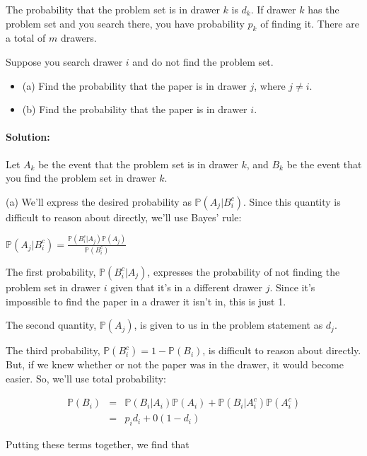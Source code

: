 \documentclass[6008notes.tex]{subfiles}
\begin{document}
The probability that the problem set is in drawer $k$ is $d_k$. If drawer $k$ has the problem set and you search there, you have probability $p_k$ of finding it. There are a total of $m$ drawers.

Suppose you search drawer $i$ and do not find the problem set.

\begin{itemize}
\item (a) Find the probability that the paper is in drawer $j$, where $j \neq i$.

\item (b) Find the probability that the paper is in drawer $i$.
\end{itemize}

\paragraph{Solution:} Let $A_k$ be the event that the problem set is in drawer $k$, and $B_k$ be the event that you find the problem set in drawer $k$.

(a) We'll express the desired probability as $\mathbb {P}(A_ j|B_ i^ c)$. Since this quantity is difficult to reason about directly, we'll use Bayes' rule:

{\centering$\mathbb {P}(A_ j|B_ i^ c) = \frac{\mathbb {P}(B_ i^ c | A_ j) \mathbb {P}(A_ j)}{\mathbb {P}(B_ i^ c)}$ \par}
 
The first probability, $\mathbb {P}(B_ i^ c | A_ j)$, expresses the probability of not finding the problem set in drawer $i$ given that it's in a different drawer $j$. Since it's impossible to find the paper in a drawer it isn't in, this is just 1.

The second quantity, $\mathbb {P}(A_ j)$, is given to us in the problem statement as $d_j$.

The third probability, $\mathbb {P}(B_ i^ c) = 1-\mathbb {P}(B_ i)$, is difficult to reason about directly. But, if we knew whether or not the paper was in the drawer, it would become easier. So, we'll use total probability:

\begin{eqnarray*}
            \mathbb{P}(B_i) &=& \mathbb{P}(B_i|A_i)\mathbb{P}(A_i) + \mathbb{P}(B_i|A_i^c)\mathbb{P}(A_i^c) \\
            &=& p_i d_i + 0 (1-d_i)
\end{eqnarray*}

Putting these terms together, we find that
\end{document}
